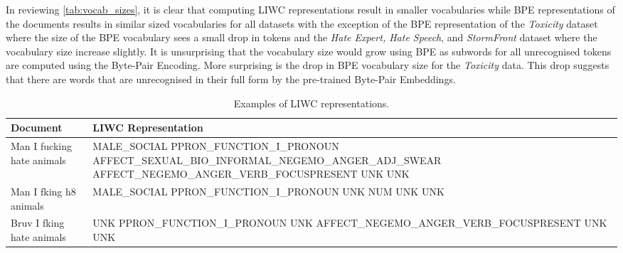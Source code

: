 \begin{table}
  \centering
  \caption{Word token and BPE representation.}
  \label{tab:bpe_tok}
\end{table}

In reviewing \cref{tab:vocab_sizes}, it is clear that computing LIWC representations result in smaller vocabularies while BPE representations of the documents results in similar sized vocabularies for all datasets with the exception of the BPE representation of the \textit{Toxicity} dataset where the size of the BPE vocabulary sees a small drop in tokens and the \textit{Hate Expert, Hate Speech}, and \textit{StormFront} dataset where the vocabulary size increase slightly.
It is unsurprising that the vocabulary size would grow using BPE as subwords for all unrecognised tokens are computed using the Byte-Pair Encoding.
More surprising is the drop in BPE vocabulary size for the \textit{Toxicity} data.
This drop suggests that there are words that are unrecognised in their full form by the pre-trained Byte-Pair Embeddings.

\begin{table}[]
\centering
\footnotesize
\begin{tabular}{l|p{10.5cm}}
Document                   & LIWC Representation \\ \hline
Man I fucking hate animals & MALE\_SOCIAL PPRON\_FUNCTION\_I\_PRONOUN AFFECT\_SEXUAL\_BIO\_INFORMAL\_NEGEMO\_ANGER\_ADJ\_SWEAR AFFECT\_NEGEMO\_ANGER\_VERB\_FOCUSPRESENT UNK UNK \\\hline
Man I fking h8 animals     & MALE\_SOCIAL PPRON\_FUNCTION\_I\_PRONOUN UNK NUM UNK UNK \\\hline
Bruv I fking hate animals  & UNK PPRON\_FUNCTION\_I\_PRONOUN UNK AFFECT\_NEGEMO\_ANGER\_VERB\_FOCUSPRESENT UNK UNK
\end{tabular}
\caption{Examples of LIWC representations.}
\label{tab:liwc_tok}
\end{table}

